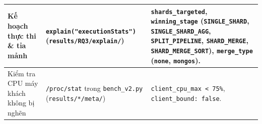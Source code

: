 \begin{table}[!htb]
\begin{tabularx}{\linewidth}{L{3.0cm} L{4.15cm} >{\raggedright\arraybackslash}X}
\midrule
Kế hoạch thực thi \& tỉa mảnh & \texttt{explain(\allowbreak"executionStats")} (\texttt{results/RQ3/explain/}) & \texttt{shards\_targeted}, \texttt{winning\_stage} (\texttt{SINGLE\_SHARD}, \texttt{SINGLE\_SHARD\_AGG}, \texttt{SPLIT\_PIPELINE}, \texttt{SHARD\_MERGE}, \texttt{SHARD\_MERGE\_SORT}), \texttt{merge\_type} (\texttt{none}, \texttt{mongos}). \\
\midrule
Kiểm tra CPU máy khách không bị nghẽn & \texttt{/proc/stat} trong \texttt{bench\_v2.py} (\texttt{results/*/meta/}) & \texttt{client\_cpu\_max < 75\%}, \texttt{client\_bound: false}. \\
\bottomrule
\end{tabularx}
\end{table}
\FloatBarrier
